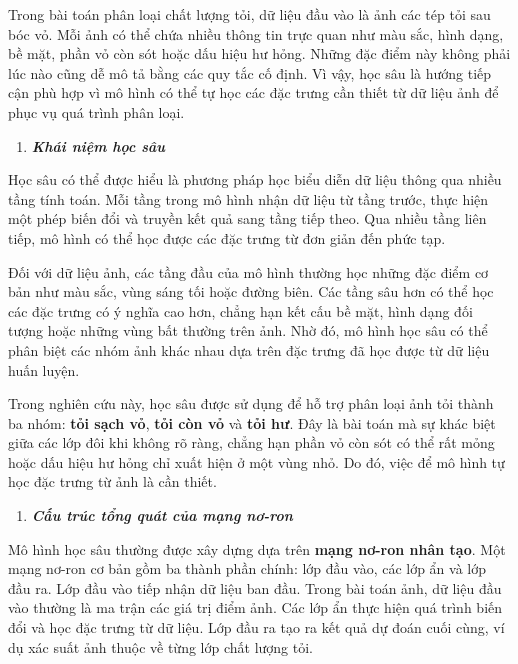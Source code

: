 \documentclass[
]{article}
\begin{document}
Trong bài toán phân loại chất lượng tỏi, dữ liệu đầu vào là ảnh các tép
tỏi sau bóc vỏ. Mỗi ảnh có thể chứa nhiều thông tin trực quan như màu
sắc, hình dạng, bề mặt, phần vỏ còn sót hoặc dấu hiệu hư hỏng. Những đặc
điểm này không phải lúc nào cũng dễ mô tả bằng các quy tắc cố định. Vì
vậy, học sâu là hướng tiếp cận phù hợp vì mô hình có thể tự học các đặc
trưng cần thiết từ dữ liệu ảnh để phục vụ quá trình phân loại.

\begin{enumerate}
\def\labelenumi{\arabic{enumi}.}
\item
  \protect{}\label{_Toc232112000}{}\emph{\textbf{Khái niệm
  học sâu}}
\end{enumerate}

Học sâu có thể được hiểu là phương pháp học biểu diễn dữ liệu thông qua
nhiều tầng tính toán. Mỗi tầng trong mô hình nhận dữ liệu từ tầng trước,
thực hiện một phép biến đổi và truyền kết quả sang tầng tiếp theo. Qua
nhiều tầng liên tiếp, mô hình có thể học được các đặc trưng từ đơn giản
đến phức tạp.

Đối với dữ liệu ảnh, các tầng đầu của mô hình thường học những đặc điểm
cơ bản như màu sắc, vùng sáng tối hoặc đường biên. Các tầng sâu hơn có
thể học các đặc trưng có ý nghĩa cao hơn, chẳng hạn kết cấu bề mặt, hình
dạng đối tượng hoặc những vùng bất thường trên ảnh. Nhờ đó, mô hình học
sâu có thể phân biệt các nhóm ảnh khác nhau dựa trên đặc trưng đã học
được từ dữ liệu huấn luyện.

Trong nghiên cứu này, học sâu được sử dụng để hỗ trợ phân loại ảnh tỏi
thành ba nhóm: \textbf{tỏi sạch vỏ}, \textbf{tỏi còn vỏ} và \textbf{tỏi
hư}. Đây là bài toán mà sự khác biệt giữa các lớp đôi khi không rõ ràng,
chẳng hạn phần vỏ còn sót có thể rất mỏng hoặc dấu hiệu hư hỏng chỉ xuất
hiện ở một vùng nhỏ. Do đó, việc để mô hình tự học đặc trưng từ ảnh là
cần thiết.

\begin{enumerate}
\def\labelenumi{\arabic{enumi}.}
\setcounter{enumi}{1}
\item
  \protect{}\label{_Toc232112001}{}\emph{\textbf{Cấu trúc
  tổng quát của mạng nơ-ron}}
\end{enumerate}

Mô hình học sâu thường được xây dựng dựa trên \textbf{mạng nơ-ron nhân
tạo}. Một mạng nơ-ron cơ bản gồm ba thành phần chính: lớp đầu vào, các
lớp ẩn và lớp đầu ra. Lớp đầu vào tiếp nhận dữ liệu ban đầu. Trong bài
toán ảnh, dữ liệu đầu vào thường là ma trận các giá trị điểm ảnh. Các
lớp ẩn thực hiện quá trình biến đổi và học đặc trưng từ dữ liệu. Lớp đầu
ra tạo ra kết quả dự đoán cuối cùng, ví dụ xác suất ảnh thuộc về từng
lớp chất lượng tỏi.
\end{document}
